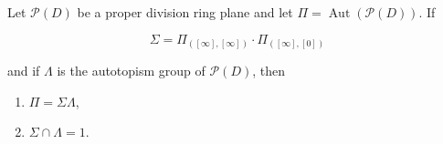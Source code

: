 Let $\mathcal{P}(D)$ be a proper division ring plane and let $\Pi = \operatorname{Aut}(\mathcal{P}(D))$. If

$$\Sigma = \Pi_{([\infty], [\infty])} \cdot \Pi_{([\infty], [0])}$$

and if $\Lambda$ is the autotopism group of $\mathcal{P}(D)$, then
\begin{enumerate}
\item[(i)] $\Pi = \Sigma \Lambda$,
\item[(ii)] $\Sigma \cap \Lambda = 1$.
\end{enumerate}
